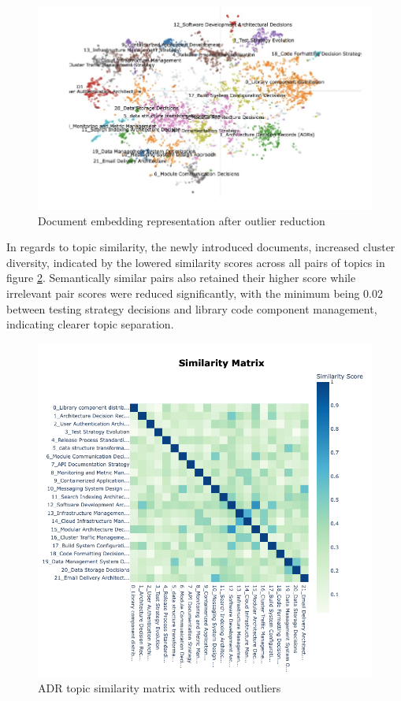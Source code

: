         \begin{figure}[H]
            \centering
            \includegraphics[scale=0.4]{figures/BerTopic_Reduced/docs_reduced_outliers.jpeg}
            \caption{Document embedding representation after outlier reduction}
            \label{fig:docs_reduced}
        \end{figure}

        In regards to topic similarity, the newly introduced documents, increased cluster diversity, indicated by the lowered similarity scores across all pairs of topics in figure \ref{fig:similarity_matrix_reduced}. Semantically similar pairs also retained their higher score while irrelevant pair scores were reduced significantly, with the minimum being 0.02 between testing strategy decisions and library code component management,  indicating clearer topic separation. 

        \begin{figure}[H]
            \centering
            \includegraphics[scale=0.4]{figures/BerTopic_Reduced/similarity_matrix_reduced_outliers.png}
            \caption{ADR topic similarity matrix with reduced outliers}
            \label{fig:similarity_matrix_reduced}
        \end{figure}


